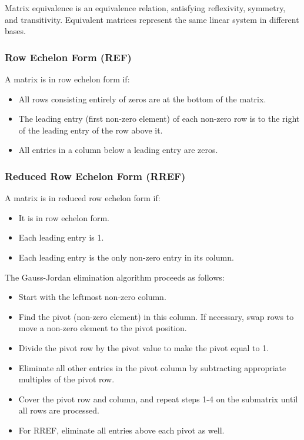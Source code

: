 Matrix equivalence is an equivalence relation, satisfying reflexivity, symmetry, and transitivity. Equivalent matrices represent the same linear system in different bases.

\subsubsection{Row Echelon Form (REF)}

A matrix is in row echelon form if:
\begin{itemize}[label=\(-\)]
    \item All rows consisting entirely of zeros are at the bottom of the matrix.
    \item The leading entry (first non-zero element) of each non-zero row is to the right of the leading entry of the row above it.
    \item All entries in a column below a leading entry are zeros.
\end{itemize}

\subsubsection{Reduced Row Echelon Form (RREF)}
A matrix is in reduced row echelon form if:
\begin{itemize}[label=\(-\)]
    \item It is in row echelon form.
    \item Each leading entry is 1.
    \item Each leading entry is the only non-zero entry in its column.
\end{itemize}

The Gauss-Jordan elimination algorithm proceeds as follows:
\begin{itemize}[label=\(-\)]
    \item Start with the leftmost non-zero column.
    \item Find the pivot (non-zero element) in this column. If necessary, swap rows to move a non-zero element to the pivot position.
    \item Divide the pivot row by the pivot value to make the pivot equal to 1.
    \item Eliminate all other entries in the pivot column by subtracting appropriate multiples of the pivot row.
    \item Cover the pivot row and column, and repeat steps 1-4 on the submatrix until all rows are processed.
    \item For RREF, eliminate all entries above each pivot as well.
\end{itemize}

